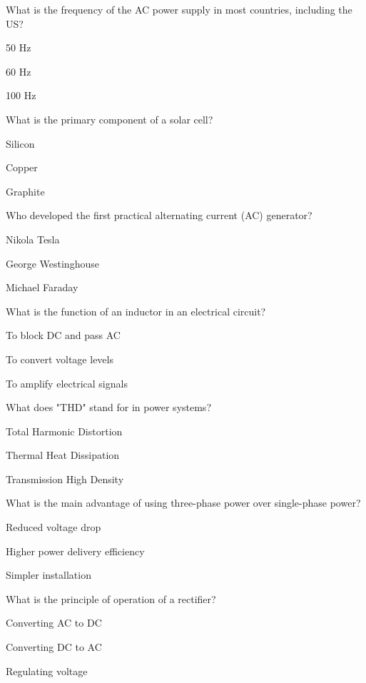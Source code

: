 \begin{enhancedmcq}{What is the frequency of the AC power supply in most countries, including the US?}
\item 50 Hz
\item 60 Hz
\item 100 Hz

\end{enhancedmcq}
\begin{enhancedmcq}{What is the primary component of a solar cell?}
\item Silicon
\item Copper
\item Graphite

\end{enhancedmcq}
\begin{enhancedmcq}{Who developed the first practical alternating current (AC) generator?}
\item Nikola Tesla
\item George Westinghouse
\item Michael Faraday

\end{enhancedmcq}
\begin{enhancedmcq}{What is the function of an inductor in an electrical circuit?}
\item To block DC and pass AC
\item To convert voltage levels
\item To amplify electrical signals

\end{enhancedmcq}
\begin{enhancedmcq}{What does "THD" stand for in power systems?}
\item Total Harmonic Distortion
\item Thermal Heat Dissipation
\item Transmission High Density

\end{enhancedmcq}
\begin{enhancedmcq}{What is the main advantage of using three-phase power over single-phase power?}
\item Reduced voltage drop
\item Higher power delivery efficiency
\item Simpler installation

\end{enhancedmcq}
\begin{enhancedmcq}{What is the principle of operation of a rectifier?}
\item Converting AC to DC
\item Converting DC to AC
\item Regulating voltage

\end{enhancedmcq}
